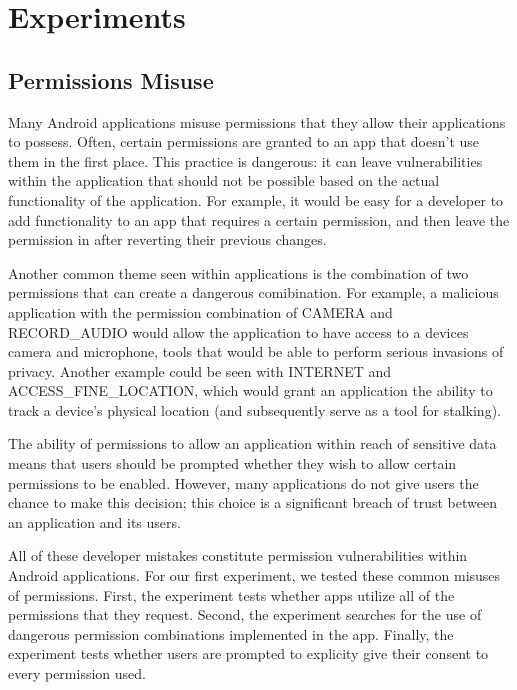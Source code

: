 \section{Experiments}
\label{sec:design}

    \subsection{Permissions Misuse}
    
        Many Android applications misuse permissions that they
        allow their applications to possess. Often, certain
        permissions are granted to an app that doesn't use them
        in the first place. This practice is dangerous: it can 
        leave vulnerabilities within the application that should
        not be possible based on the actual functionality of the
        application. For example, it would be easy for a 
        developer to add functionality to an app that requires a
        certain permission, and then leave the permission in after
        reverting their previous changes. 
        
        Another common theme seen within applications
        is the combination of two permissions that can create a 
        dangerous comibination. For example, a malicious 
        application with the permission combination of
        CAMERA and RECORD\_AUDIO would allow the application
        to have access to a devices camera and microphone, tools
        that would be able to perform serious invasions of privacy. 
        Another example could be seen with INTERNET and 
        ACCESS\_FINE\_LOCATION, which would grant an application the
        ability to track a device's physical location (and 
        subsequently serve as a tool for stalking).

        The ability of permissions to allow an application within
        reach of sensitive data means that users should be prompted
        whether they wish to allow certain permissions to be enabled.
        However, many applications do not give users the chance to 
        make this decision; this choice is a significant breach of trust 
        between an application and its users.

        All of these developer mistakes constitute permission vulnerabilities
        within Android applications. For our first experiment, we
        tested these common misuses of permissions. First, 
        the experiment tests whether apps utilize all of the
        permissions that they request. Second, the experiment 
        searches for the use of dangerous permission combinations
        implemented in the app. Finally, the experiment tests whether
        users are prompted to explicity give their consent to every
        permission used.
        
